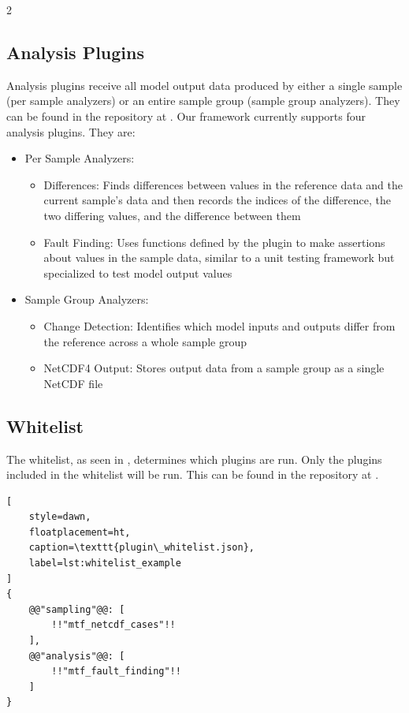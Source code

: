 \documentclass[10pt]{article}
\begin{document}
\begin{multicols}{2}
\subsection{Analysis Plugins}
Analysis plugins receive all model output data produced by either a single sample (per sample analyzers) or an entire sample group (sample group analyzers). They can be found in the repository at . Our framework currently supports four analysis plugins. They are:
\begin{itemize}
    \item Per Sample Analyzers:
    \begin{itemize}
        \item Differences: Finds differences between values in the reference data and the current sample's data and then records the indices of the difference, the two differing values, and the difference between them
        \item Fault Finding: Uses functions defined by the plugin to make assertions about values in the sample data, similar to a unit testing framework but specialized to test model output values
    \end{itemize}
    
    \item Sample Group Analyzers:
    \begin{itemize}
        \item Change Detection: Identifies which model inputs and outputs differ from the reference across a whole sample group
        \item NetCDF4 Output: Stores output data from a sample group as a single NetCDF file
    \end{itemize}
\end{itemize}

\subsection{Whitelist}
The whitelist, as seen in , determines which plugins are run. Only the plugins included in the whitelist will be run. This can be found in the repository at .

\begin{lstlisting}[
    style=dawn,
    floatplacement=ht,
    caption=\texttt{plugin\_whitelist.json},
    label=lst:whitelist_example
]
{
    @@"sampling"@@: [
        !!"mtf_netcdf_cases"!!
    ],
    @@"analysis"@@: [
        !!"mtf_fault_finding"!!
    ]
}
\end{lstlisting}


\end{multicols}
\end{document}
